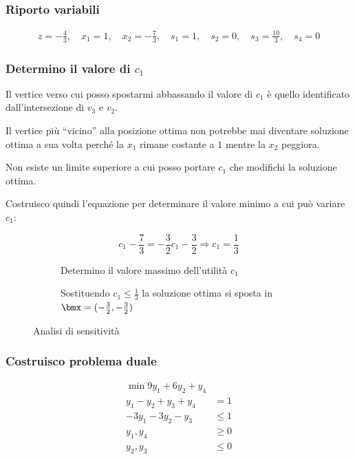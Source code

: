 \documentclass[\main/main.tex]{subfiles}
\begin{document}
\subsubsection*{Riporto variabili}

\begin{align*}
  z   = -\frac{4}{3},\quad
  x_1 = 1           ,\quad
  x_2 = -\frac{7}{3},\quad
  s_1 = 1           ,\quad
  s_2 = 0           ,\quad
  s_3 = \frac{10}{3},\quad
  s_4 = 0
\end{align*}
\subsubsection*{Determino il valore di $c_1$}
Il vertice verso cui posso spostarmi abbassando il valore di $c_1$ è quello identificato dall'intersezione di $v_3$ e $v_2$.

Il vertice più ``vicino'' alla posizione ottima non potrebbe mai diventare soluzione ottima a sua volta perché la $x_1$ rimane costante a $1$ mentre la $x_2$ peggiora.

Non esiste un limite superiore a cui posso portare $c_1$ che modifichi la soluzione ottima.

Costruisco quindi l'equazione per determinare il valore minimo a cui può variare $c_1$:

\begin{figure}
  \begin{subfigure}{0.49\textwidth}
    \[
      c_1 -\frac{7}{3} = -\frac{3}{2}c_1 - \frac{3}{2} \Rightarrow c_1 = \frac{1}{3}
    \]
    \caption{Determino il valore massimo dell'utilità $c_1$}
  \end{subfigure}
  \begin{subfigure}{0.49\textwidth}
    \caption{Sostituendo $c_1\leq\frac{1}{3}$ la soluzione ottima si sposta in $\bmx=(-\frac{3}{2},-\frac{3}{2})$}
  \end{subfigure}
  \caption{Analisi di sensitività}
\end{figure}

\subsubsection*{Costruisco problema duale}
\begin{align*}
  \min 9y_1 + 6y_2 + y_4       \\
  y_1 -y_2 + y_3 +y_4 & = 1    \\
  -3y_1 - 3y_2 -y_3   & \leq 1 \\
  y_1, y_4            & \geq 0 \\
  y_2, y_3            & \leq 0 \\
\end{align*}
\end{document}
